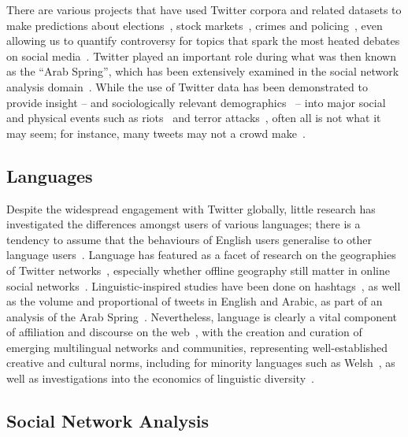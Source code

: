 \documentclass{llncs}
\begin{document}
There are various projects that have used Twitter corpora and related
datasets to make predictions about
elections~\cite{tumasjan-et-al:2010}, stock
markets~\cite{zhang-et-al:2011}, crimes and
policing~\cite{gerber:2014,oatley+crick:2015}, even allowing us to
quantify controversy for topics that spark the most heated debates on
social media~\cite{garimella-et-al:2016}. Twitter played an important
role during what was then known as the ``Arab Spring'', which has been
extensively examined in the social network analysis
domain~\cite{lotan-et-al:2011,howard-et-al:2011,comunello+anzera:2012,wolfsfeld-et-al:2013,bruns-et-al:2013}.
While the use of Twitter data has been demonstrated to provide insight
-- and sociologically relevant demographics~\cite{sloan-et-al:2013} --
into major social and physical events such as
riots~\cite{procter-et-al:2013} and terror
attacks~\cite{burnap-et-al:2014}, often all is not what it may seem;
for instance, many tweets may not a crowd
make~\cite{liang-et-al:2013}.

\subsection{Languages}

Despite the widespread engagement with Twitter globally, little
research has investigated the differences amongst users of various
languages; there is a tendency to assume that the behaviours of
English users generalise to other language
users~\cite{hong-et-al:2011}. Language has featured as a facet of
research on the geographies of Twitter
networks~\cite{takhteyev-et-al:2012}, especially whether offline
geography still matter in online social
networks~\cite{kulshrestha-et-al:2012}. Linguistic-inspired studies
have been done on hashtags~\cite{cunha-et-al:2011}, as well as the
volume and proportional of tweets in English and Arabic, as part of an
analysis of the Arab Spring~\cite{bruns-et-al:2013}. Nevertheless,
language is clearly a vital component of affiliation and discourse on
the web~\cite{zappavigna+martin:2012}, with the creation and curation
of emerging multilingual networks and communities, representing
well-established creative and cultural norms, including for minority
languages such as Welsh~\cite{gj+uj:2013}, as well as investigations
into the economics of linguistic
diversity~\cite{ginsburgh+weber:2011}.

\subsection{Social Network Analysis}
\end{document}
